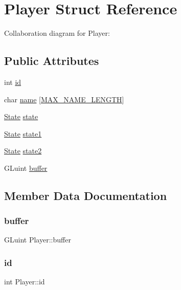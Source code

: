 \hypertarget{structPlayer}{}\section{Player Struct Reference}
\label{structPlayer}


Collaboration diagram for Player\+:
\subsection*{Public Attributes}
\begin{DoxyCompactItemize}
\item 
int \hyperlink{structPlayer_a05e05f3a23de78da7ec032ec2bcf8c6c}{id}
\item 
char \hyperlink{structPlayer_a000f74f4241ebc344866c82bec4ed5ef}{name} \mbox{[}\hyperlink{main_8c_a0c397a708cec89c74029582574516b30}{M\+A\+X\+\_\+\+N\+A\+M\+E\+\_\+\+L\+E\+N\+G\+TH}\mbox{]}
\item 
\hyperlink{structState}{State} \hyperlink{structPlayer_ac4a623bf6650a719187c50bb0413b9a0}{state}
\item 
\hyperlink{structState}{State} \hyperlink{structPlayer_a7712ad6df23e875de18fb38537620909}{state1}
\item 
\hyperlink{structState}{State} \hyperlink{structPlayer_a7b894c51bb7a740af4a2ffef56a4e788}{state2}
\item 
G\+Luint \hyperlink{structPlayer_a6be397c2a7cb79256e85dc6a96055f45}{buffer}
\end{DoxyCompactItemize}


\subsection{Member Data Documentation}
\mbox{\label{structPlayer_a6be397c2a7cb79256e85dc6a96055f45}} 
\subsubsection{\texorpdfstring{buffer}{buffer}}
{\footnotesize\ttfamily G\+Luint Player\+::buffer}

\mbox{\label{structPlayer_a05e05f3a23de78da7ec032ec2bcf8c6c}} 
\subsubsection{\texorpdfstring{id}{id}}
{\footnotesize\ttfamily int Player\+::id}

